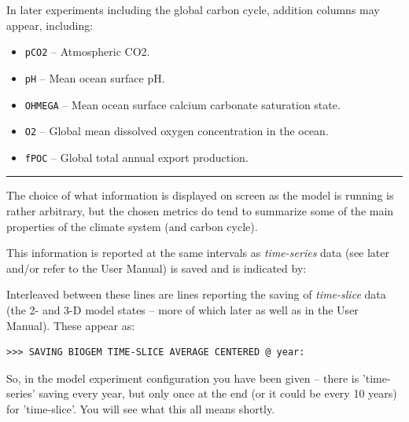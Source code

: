 \noindent In later experiments including the global carbon cycle, addition columns may appear, including:

\vspace{1mm}\begin{itemize}
\item[] \texttt{pCO2}  -- Atmospheric CO2.
\item[] \texttt{pH} -- Mean ocean surface pH.
\item[] \texttt{OHMEGA} -- Mean ocean surface calcium carbonate saturation state.
\item[] \texttt{O2} -- Global mean dissolved oxygen concentration in the ocean.
\item[] \texttt{fPOC} -- Global total annual export production.
\end{itemize}\vspace{1mm}

\vspace{1mm}\noindent\rule{4cm}{0.5pt}\vspace{2mm}

\newpage

\noindent The choice of what information is displayed on screen as the model is running is rather arbitrary, but the chosen metrics do tend to summarize some of the main properties of the climate system (and carbon cycle).

This information is reported at the same intervals as \textit{time-series} data (see later and/or refer to the User Manual) is saved and is indicated by:

Interleaved between these lines are lines reporting the saving of \textit{time-slice} data (the 2- and 3-D model states – more of which later as well as in the User Manual). These appear as:

\vspace{-2mm}\small\begin{verbatim}
>>> SAVING BIOGEM TIME-SLICE AVERAGE CENTERED @ year:
\end{verbatim}\normalsize\vspace{-2mm}

So, in the model experiment configuration you have been given -- there is 'time-series' saving every year, but only once at the end (or it could be every 10 years) for 'time-slice'. You will see what this all means shortly.

